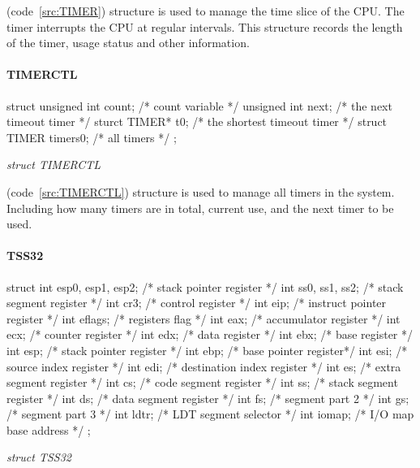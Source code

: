 \documentclass{swfcthesis}
\begin{document}
(code~\ref{src:TIMER}) structure is used to manage the time slice of the CPU. The timer
interrupts the CPU at regular intervals. This structure records the length of the timer,
usage status and other information.



\paragraph{TIMERCTL}

\begin{listing}[H]
  \begin{codeblock}
\begin{ccode}
struct 
{ 
  unsigned int count;   /* count variable */
  unsigned int next;    /* the next timeout timer */
  sturct TIMER* t0;     /* the shortest timeout timer */
  struct TIMER timers0; /* all timers */
};
\end{ccode}
  \end{codeblock}
  \caption{\emph{struct TIMERCTL}}\label{src:TIMERCTL}
\end{listing}

(code~\ref{src:TIMERCTL}) structure is used to manage all timers in the system. Including
how many timers are in total, current use, and the next timer to be used.



\paragraph{TSS32}

\begin{listing}[H]
  \begin{codeblock}
\begin{ccode}
struct 
{ 
  int esp0, esp1, esp2; /* stack pointer register */
  int ss0, ss1, ss2;    /* stack segment register */
  int cr3;              /* control register */
  int eip;              /* instruct pointer register */
  int eflags;           /* registers flag */
  int eax;              /* accumulator register */
  int ecx;              /* counter register */
  int edx;              /* data register */
  int ebx;              /* base register */
  int esp;              /* stack pointer register */
  int ebp;              /* base pointer register*/
  int esi;              /* source index register */
  int edi;              /* destination index register */
  int es;               /* extra segment register */
  int cs;               /* code segment register */
  int ss;               /* stack segment register */
  int ds;               /* data segment register */
  int fs;               /* segment part 2 */
  int gs;               /* segment part 3 */
  int ldtr;             /* LDT segment selector */
  int iomap;            /* I/O map base address */
};
\end{ccode}
  \end{codeblock}
  \caption{\emph{struct TSS32}}\label{src:TSS32}
\end{listing}
\end{document}
